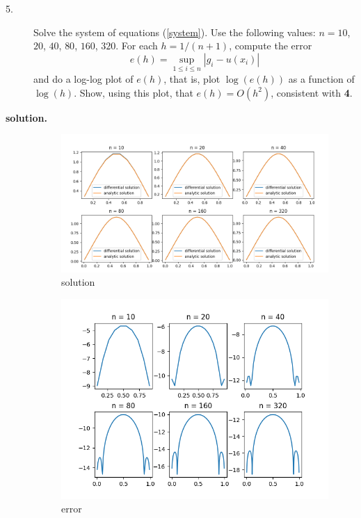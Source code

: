 \documentclass[12pt]{article}
\begin{document}
\begin{description}
\item[5.] Solve the system of equations
(\ref{system}). Use the following values: $n=10$, $20$, $40$, $80$, $160$, $320$.
For each $h=1/(n+1)$, compute the error
\begin{equation}
e(h) = \sup_{1\le i \le n} |g_i - u(x_i)|
\end{equation}
and do a log-log plot of $e(h)$, that is, plot $\log(e(h))$ as a
function of $\log(h)$. Show, using this plot, that $e(h) = O(h^2)$,
consistent with \textbf{4}.
\item[\textbf{solution.}]
\begin{figure}[H]
    \centering
    \includegraphics[width=\textwidth]{gra/solution5.png}
    \caption{solution}
\end{figure}

\begin{figure}[H]
    \centering
    \includegraphics[width=\textwidth]{gra/error5.png}
    \caption{error}
\end{figure}



\end{description}
\end{document}
